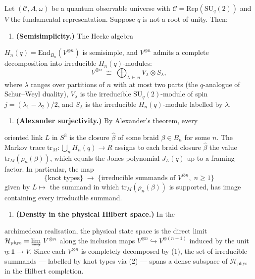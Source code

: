 \begin{proposition}
  \label{prop:knot-eigenbasis-complete}
Let $(\mathcal{C}, A, \omega)$ be a quantum observable universe with
$\mathcal{C} = \mathrm{Rep}(\mathrm{SU}_q(2))$ and $V$ the fundamental
representation.  Suppose $q$ is not a root of unity.  Then:

\begin{enumerate}
  \item \textbf{(Semisimplicity.)}  The Hecke algebra
\end{enumerate}
   $H_n(q) = \mathrm{End}_{B_n}(V^{\otimes n})$ is semisimple, and
   $V^{\otimes n}$ admits a complete decomposition into irreducible
   $H_n(q)$-modules:
\[
V^{\otimes n}
     \;\cong\;
     \bigoplus_{\lambda \,\vdash\, n}
     V_\lambda \otimes S_\lambda,
\]
   where $\lambda$ ranges over partitions of $n$ with at most two parts
   (the $q$-analogue of Schur--Weyl duality), $V_\lambda$ is the
   irreducible $\mathrm{SU}_q(2)$-module of spin
   $j = (\lambda_1 - \lambda_2)/2$, and $S_\lambda$ is the irreducible
   $H_n(q)$-module labelled by $\lambda$.
\begin{enumerate}
  \item \textbf{(Alexander surjectivity.)}  By Alexander's theorem, every
\end{enumerate}
   oriented link $L$ in $S^3$ is the closure $\hat{\beta}$ of some braid
   $\beta \in B_n$ for some $n$.  The Markov trace
   $\mathrm{tr}_M \colon \bigcup_n H_n(q) \to R$ assigns to each braid
   closure $\hat{\beta}$ the value
   $\mathrm{tr}_M(\rho_n(\beta))$, which equals the Jones polynomial
   $J_L(q)$ up to a framing factor.  In particular, the map
\[
\{\text{knot types}\}
     \;\longrightarrow\;
     \{\text{irreducible summands of } V^{\otimes n},\; n \geq 1\}
\]
   given by $L \mapsto$ the summand in which $\mathrm{tr}_M(\rho_n(\beta))$
   is supported, has image containing every irreducible summand.
\begin{enumerate}
  \item \textbf{(Density in the physical Hilbert space.)}  In the
\end{enumerate}
   archimedean realisation, the physical state space is the direct limit
   $\mathcal{H}_{\mathrm{phys}} = \varinjlim\, V^{\otimes n}$ along
   the inclusion maps
   $V^{\otimes n} \hookrightarrow V^{\otimes (n+1)}$ induced by the
   unit $\eta \colon \mathbf{1} \to V$.  Since each $V^{\otimes n}$ is
   completely decomposed by (1), the set of irreducible summands ---
   labelled by knot types via (2) --- spans a dense subspace of
   $\mathcal{H}_{\mathrm{phys}}$ in the Hilbert completion.


\end{proposition}
